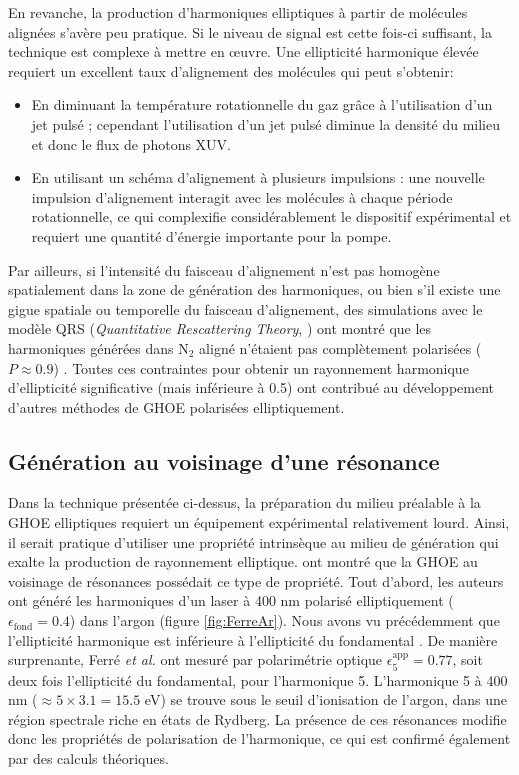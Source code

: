 En revanche, la production d'harmoniques elliptiques à partir de molécules alignées s'avère peu pratique. Si le niveau de signal est cette fois-ci suffisant, la technique est complexe à mettre en \oe uvre. Une ellipticité harmonique élevée requiert un excellent taux d'alignement des molécules qui peut s'obtenir:
\begin{itemize}
\item En diminuant la température rotationnelle du gaz grâce à l'utilisation d'un jet pulsé ; cependant l'utilisation d'un jet pulsé diminue la densité du milieu et donc le flux de photons XUV.
\item En utilisant un schéma d'alignement à plusieurs impulsions : une nouvelle impulsion d'alignement interagit avec les molécules à chaque période rotationnelle, ce qui complexifie considérablement le dispositif expérimental et requiert une quantité d'énergie importante pour la pompe.
\end{itemize}
Par ailleurs, si l'intensité du faisceau d'alignement n'est pas homogène spatialement dans la zone de génération des harmoniques, ou bien s'il existe une gigue spatiale ou temporelle du faisceau d'alignement, des simulations avec le modèle QRS (\textit{Quantitative Rescattering Theory}, ) ont montré que les harmoniques générées dans N$_2$ aligné n'étaient pas complètement polarisées ($P \approx 0.9$) . Toutes ces contraintes pour obtenir un rayonnement harmonique d'ellipticité significative (mais inférieure à 0.5) ont contribué au développement d'autres méthodes de GHOE polarisées elliptiquement.

\subsection{Génération au voisinage d'une résonance}
Dans la technique présentée ci-dessus, la préparation du milieu préalable à la GHOE elliptiques requiert un équipement expérimental relativement lourd. Ainsi, il serait pratique d'utiliser une propriété intrinsèque au milieu de génération qui exalte la production de rayonnement elliptique.  ont montré que la GHOE au voisinage de résonances possédait ce type de propriété. Tout d'abord, les auteurs ont généré les harmoniques d'un laser à 400 nm polarisé elliptiquement ($\epsilon_{\text{fond}} = 0.4$) dans l'argon (figure \ref{fig:FerreAr}). Nous avons vu précédemment que l'ellipticité harmonique est inférieure à l'ellipticité du fondamental . De manière surprenante, Ferré \textit{et al.} ont mesuré par polarimétrie optique $\epsilon_5^{\text{app}} = 0.77$, soit deux fois l'ellipticité du fondamental, pour l'harmonique 5. L'harmonique 5 à 400 nm ($\approx 5 \times 3.1 = 15.5$ eV) se trouve sous le seuil d'ionisation de l'argon, dans une région spectrale riche en états de Rydberg. La présence de ces résonances modifie donc les propriétés de polarisation de l'harmonique, ce qui est confirmé également par des calculs théoriques.

